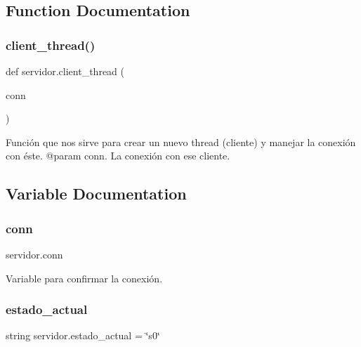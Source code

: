 \subsection{Function Documentation}
\mbox{\label{namespaceservidor_a8548dd2cea1eb0587af6521b18bbc989}} 
\subsubsection{\texorpdfstring{client\+\_\+thread()}{client\_thread()}}
{\footnotesize\ttfamily def servidor.\+client\+\_\+thread (\begin{DoxyParamCaption}\item[{}]{conn }\end{DoxyParamCaption})}

\begin{DoxyVerb}Función que nos sirve para crear un nuevo thread (cliente) y manejar la conexión con éste.
@param conn. La conexión con ese cliente.
\end{DoxyVerb}
 

\subsection{Variable Documentation}
\mbox{\label{namespaceservidor_a6c80b4f26b7083ecd69b24985e6f9d1e}} 
\subsubsection{\texorpdfstring{conn}{conn}}
{\footnotesize\ttfamily servidor.\+conn}



Variable para confirmar la conexión. 

\mbox{\label{namespaceservidor_a08a280b4474bca22179197a9e23f3dde}} 
\subsubsection{\texorpdfstring{estado\+\_\+actual}{estado\_actual}}
{\footnotesize\ttfamily string servidor.\+estado\+\_\+actual = \char`\"{}s0\char`\"{}}



